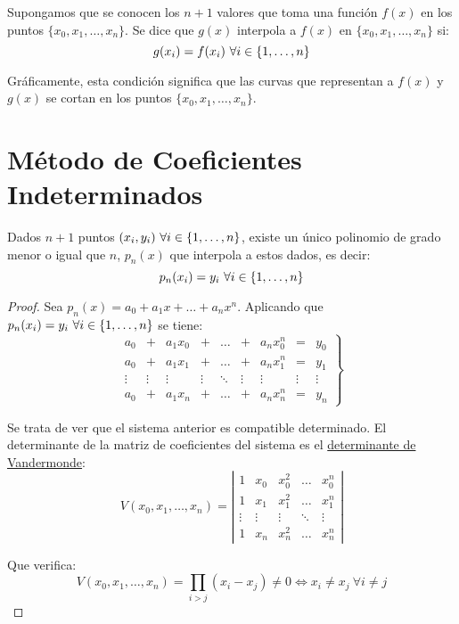 \begin{definicion}
    Supongamos que se conocen los $n+1$ valores que toma una función $f(x)$ en los puntos $\{x_0, x_1,\ldots, x_n\}$.
    Se dice que $g(x)$ interpola a $f(x)$ en $\{x_0, x_1,\ldots, x_n\}$ si:
    $$g(x_i)=f(x_i) \ \forall i \in \{1, \ldots, n\}$$

    Gráficamente, esta condición significa que las curvas que representan a $f(x)$ y $g(x)$ se cortan en los puntos
$\{x_0, x_1, \ldots, x_n\}$.
\end{definicion}

\section{Método de Coeficientes Indeterminados}

\begin{teo}
    Dados $n+1$ puntos $(x_i,y_i) \ \forall i \in \{1, \ldots, n\}$, existe un único polinomio de grado menor o igual que $n$, $p_n(x)$ que
    interpola a estos dados, es decir:
    $$p_n(x_i)=y_i \ \forall i \in \{1, \ldots, n\}$$
\end{teo}
\begin{proof}
    Sea $p_n(x)=a_0 + a_1x + \ldots + a_nx^n$. Aplicando que $p_n(x_i)=y_i \ \forall i \in \{1, \ldots, n\}$ se tiene:
    $$\left.\begin{array}{ccccccccc}
            a_0    & +      & a_1x_0 & +      & \ldots & +      & a_nx_0^n & =      & y_0    \\
            a_0    & +      & a_1x_1 & +      & \ldots & +      & a_nx_1^n & =      & y_1    \\
            \vdots & \vdots & \vdots & \vdots & \ddots & \vdots & \vdots   & \vdots & \vdots \\
            a_0    & +      & a_1x_n & +      & \ldots & +      & a_nx_n^n & =      & y_n
        \end{array}\right\}$$

    \noindent
    Se trata de ver que el sistema anterior es compatible determinado. El determinante de la matriz de coeficientes
    del sistema es el \underline{determinante de Vandermonde}:
    $$V(x_0,x_1,\ldots, x_n) = \left|\begin{array}{ccccc}
            1      & x_0    & x_0^2  & \ldots & x_0^n  \\
            1      & x_1    & x_1^2  & \ldots & x_1^n  \\
            \vdots & \vdots & \vdots & \ddots & \vdots \\
            1      & x_n    & x_n^2  & \ldots & x_n^n
        \end{array}\right|$$

    Que verifica:
    $$V(x_0,x_1,\ldots, x_n) = \prod_{i>j} (x_i-x_j)\neq 0 \Leftrightarrow x_i\neq x_j \ \forall i \neq j$$
\end{proof}

